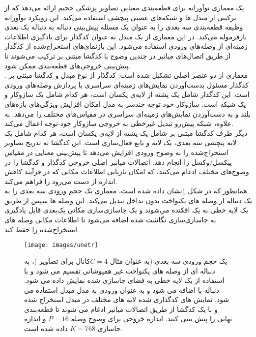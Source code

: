  یک معماری نوآورانه برای قطعه‌بندی معنایی تصاویر پزشکی حجیم ارائه می‌دهد که از ترکیبی از مبدل ها و شبکه‌های عصبی پیچشی استفاده می‌کند. این رویکرد نوآورانه وظیفه قطعه‌بندی سه بعدی را به عنوان یک مسئله پیش‌بینی دنباله به دنباله یک بعدی بازفرموله می‌کند. در این معماری از یک مبدل به عنوان کدگذار برای یادگیری اطلاعات زمینه‌ای از وصله‌های ورودی استفاده می‌شود. این بازنمای‌های استخراج‌شده از کدگذار از طریق اتصال‌های میانبر در چندین وضوح با کدگشا مبتنی بر ترکیب می‌شوند تا پیش‌بینی خروجی‌های قطعه‌بندی ممکن شود.
\\
معماری  از دو عنصر اصلی تشکیل شده است: کدگذار از نوع مبدل و کدگشا مبتنی بر . کدگذار مسئول بدست‌آوردن نمایش‌های زمینه‌ای سراسری با پردازش وصله‌های ورودی است. این کدگذار شامل یک پشته از لایه‌ی یکسان است، هر کدام شامل یک سازوکار و یک شبکه است. سازوکار خود-توجه چندسر به مدل امکان افزایش ویژگی‌های بازه‌های بلند و به دست‌آوردن نمایش‌های زمینه‌ای سراسری در مقیاس‌های مختلف را می‌دهد. به علاوه، شبکه پیش‌رو تبدیل غیرخطی به خروجی سازوکار خود-توجه اعمال می‌کند.
\\
دیگر طرف کدگشا مبتنی بر شامل یک پشته از  لایه‌ی یکسان است، هر کدام شامل یک لایه پیچشی سه بعدی، یک لایه و تابع فعال‌سازی  است. این کدگشا به تدریج تصاویر استخراج‌شده را به وضوح ورودی افزایش می‌دهد تا پیش‌بینی معنایی در مقیاس پیکسل/وکسل را انجام دهد. اتصالات میانبر اصلی خروجی کدگذار و کدگشا را در وضوح‌های مختلف ادغام می‌کنند، که امکان بازیابی اطلاعات مکانی که در فرآیند کاهش اندازه از دست می‌رود را فراهم می‌کند.
\\
همانطور که در شکل \ref{fig:unetr}نشان داده شده است، معماری  یک حجم ورودی سه بعدی را به یک دنباله از وصله های یکنواخت بدون تداخل تبدیل می‌کند. این وصله ها سپس از طریق یک لایه خطی به یک افکنده می‌شوند و یک جاسازی‌سازی مکانی یک‌بعدی قابل یادگیری به جاسازی‌سازی نگاشت شده اضافه می‌شود تا اطلاعات مکانی وصله های استخراج‌شده را حفظ کند.
\begin{figure}[h]
\centerline{\texttt{[image: images/unetr]}}
\caption[\hspace{0.5em}معماری ]{    یک حجم ورودی سه بعدی (به عنوان مثال $C = 4 $کانال برای تصاویر )، به دنباله ای از وصله های یکنواخت غیر همپوشانی تقسیم می شود و با استفاده از یک لایه خطی به فضای جاسازی شده نمایش داده می شود. دنباله با  اضافه می شود و به عنوان ورودی به مدل مبدل استفاده می شود. نمایش های کدگذاری شده لایه های مختلف در مبدل استخراج شده و با یک کدگشا از طریق اتصالات میانبر ادغام می شوند تا قطعه‌بندی نهایی را پیش بینی کنند. اندازه خروجی برای وضوح وصله $P = 16$ و اندازه جاسازی $K = 768$ داده شده است\cite{hatamizadeh2022unetr}.
}
\label{fig:unetr}
\end{figure}

